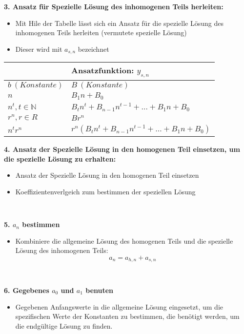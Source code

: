 \textbf{3. Ansatz für Spezielle Lösung des inhomogenen Teils herleiten:}

\begin{itemize}
\item Mit Hile der Tabelle lässt sich ein Ansatz für die spezielle Lösung des inhomogenen Teils herleiten (vermutete spezielle Lösung)
\item Dieser wird mit $a_{s,n}$ bezeichnet
\end{itemize}

\begin{table}[h]
\renewcommand{\arraystretch}{1.5}
\begin{tabular}{l|l}
& Ansatzfunktion: $y_{s,n}$\\
\hline
$b \ (Konstante)$ & $B \ (Konstante)$\\
$n$ & $B_1 n + B_0$\\
$n^t, t \in \mathbb{N}$ & $B_t n^t + B_{n-1} n^{t-1} + \dots + B_1 n + B_0$\\
$r^n, r \in R$ & $Br^n$\\
$n^t r^n$ & $r^n (B_t n^t + B_{n-1} n^{t-1} + \dots + B_1 n + B_0)$
\end{tabular}
\end{table}

\textbf{4. Ansatz der Spezielle Lösung in den homogenen Teil einsetzen, um die spezielle Lösung zu erhalten:}

\begin{itemize}
\item Ansatz der Spezielle Lösung in den homogenen Teil einsetzen
\item Koeffizientenverlgeich zum bestimmen der speziellen Lösung
\end{itemize}\

\textbf{5. $a_n$ bestimmen}

\begin{itemize}
\item Kombiniere die allgemeine Lösung des homogenen Teils und die spezielle Lösung des inhomogenen Teils: $$a_n = a_{h, n} + a_{s, n}$$
\end{itemize}\

\textbf{6. Gegebenes $a_0$ und $a_1$ benuten}

\begin{itemize}
\item Gegebenen Anfangswerte in die allgemeine Lösung eingesetzt, um die spezifischen Werte der Konstanten zu bestimmen, die benötigt werden, um die endgültige Lösung zu finden.
\end{itemize}\
\\

